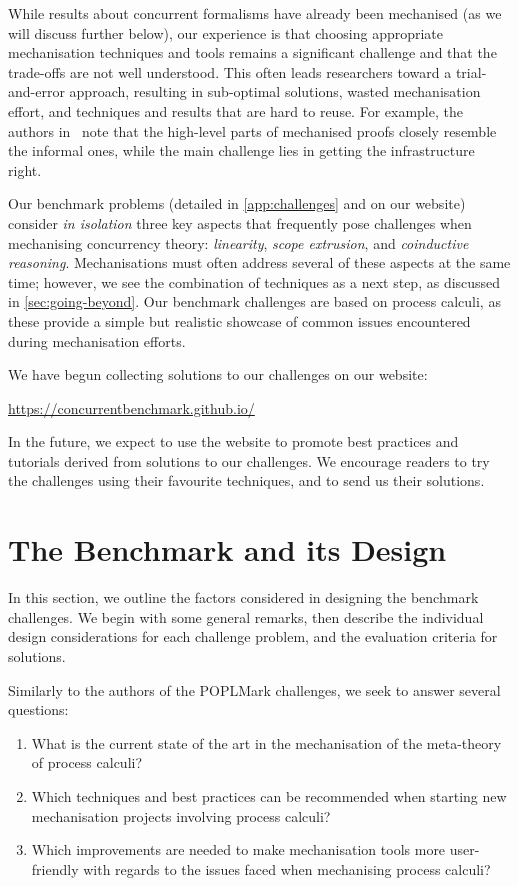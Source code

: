 \documentclass[runningheads]{llncs}
\begin{document}
While results about concurrent
formalisms have already been mechanised (as we will discuss further
below), our experience is that choosing appropriate mechanisation
techniques and tools remains a significant challenge and that the
trade-offs are not well understood.  This often leads researchers
toward a trial-and-error approach, resulting in sub-optimal solutions,
wasted mechanisation effort, and techniques and results that are hard
to reuse. For example, the authors in~\cite{Cruz-Filipe2021b} note that the high-level parts of
mechanised proofs closely resemble the informal ones, while the
main challenge lies in getting the infrastructure right.

Our benchmark problems (detailed in \cref{app:challenges} and on our website) consider
\emph{in isolation} three key aspects that frequently pose challenges
when mechanising concurrency theory: \emph{linearity}, \emph{scope
  extrusion}, and \emph{coinductive reasoning}.  Mechanisations must
often address several of these aspects at the same time; however, we
see the combination of techniques as a next
step, as discussed in \cref{sec:going-beyond}.
Our benchmark challenges are based on process calculi, as these provide a simple but
realistic showcase of common issues encountered during mechanisation
efforts.

We have begun collecting solutions to our challenges on our website:
%
\begin{center}
  \url{https://concurrentbenchmark.github.io/}
\end{center}
%
In the future, we expect to use the website to promote best practices and tutorials derived from solutions to our challenges.
We encourage readers to try the challenges using their favourite techniques, and to send us their solutions.

\section{The Benchmark and its Design}\label{sec:design-discussion}
In this section, we outline the factors considered in designing the benchmark challenges.
We begin with some general remarks, then describe the individual design considerations for each challenge problem, and the evaluation criteria for solutions.

Similarly to the authors of the POPLMark challenges, we seek to answer several questions:
\begin{enumerate}[label=\textbf{(Q\arabic*)},leftmargin=10mm]
\item\label{item:rq1} What is the current state of the art in the mechanisation of  the meta-theory of process calculi?
\item\label{item:rq2} Which techniques and best practices can be recommended when starting new mechanisation projects involving process calculi?
\item\label{item:rq3} Which improvements are needed to make mechanisation tools more user-friendly with regards to the issues faced when mechanising process calculi?
\end{enumerate}
\end{document}
